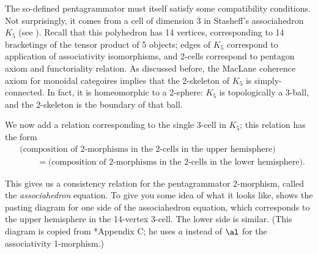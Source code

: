 The so-defined pentagrammator must itself satisfy some compatibility
conditions. Not surprisingly, it comes from a cell of dimension 3 in Stasheff's
associahedron $K_5$ (see ). Recall that  this polyhedron has
14 vertices, corresponding to 14 bracketings of the tensor product of 5
objects; edges of $K_5$  correspond to application of associativity
isomorphisms, and 2-cells correspond to  pentagon axiom and functoriality
relation. As discussed before, the MacLane coherence axiom for monoidal
categoires implies that the 2-skeleton of $K_5$ is simply-connected.  In fact,
it is homeomorphic to a 2-sphere: $K_5$ is topologically a 3-ball, and the
2-skeleton is the boundary of that ball.

We now add a relation corresponding to the single 3-cell in $K_5$;
this relation has the form
\begin{align*}
  &\text{(composition
  of 2-morphisms in the 2-cells in the upper hemisphere)}\\
  & \qquad =
  \text{(composition of 2-morphisms in the 2-cells in the lower hemisphere)}.
\end{align*}

This gives us a consistency relation for the pentagrammator 2-morphism, called
the \emph{associahedron} equation. To give you some idea of what it looks like,
 shows the pasting diagram for one side of the
associahedron equation, which corresponds to the upper hemisphere in the
14-vertex 3-cell. The lower side is similar. (This diagram is copied from
*{Appendix C}; he uses $a$ instead of $\al$ for the
associativity 1-morphism.)

